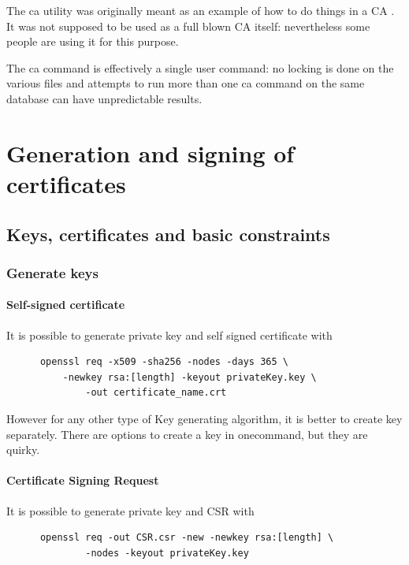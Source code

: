 \documentclass[10pt, a4paper]{report}
\begin{document}
{\begin{displayquote}
The ca utility was originally meant as an example of how to do things in a CA . It was not supposed to be used as a full blown CA itself: nevertheless some people are using it for this purpose.

The ca command is effectively a single user command: no locking is done on the various files and attempts to run more than one ca command on the same database can have unpredictable results. 
\end{displayquote}
  
\section{Generation and signing of certificates}

  \subsection{Keys, certificates and basic constraints}
  
    \subsubsection{Generate keys}
    
      \paragraph{Self-signed certificate}
      It is possible to generate private key and self signed certificate with 
      \begin{verbatim}
      openssl req -x509 -sha256 -nodes -days 365 \
	      -newkey rsa:[length] -keyout privateKey.key \
              -out certificate_name.crt
      \end{verbatim}

However for any other type of Key generating algorithm, it is better to create key separately. There are options to create a key in onecommand, but they are quirky.

      \paragraph{Certificate Signing Request}
      It is possible to generate private key and CSR with
      \begin{verbatim}
      openssl req -out CSR.csr -new -newkey rsa:[length] \
              -nodes -keyout privateKey.key
      \end{verbatim}
      
}
\end{document}
